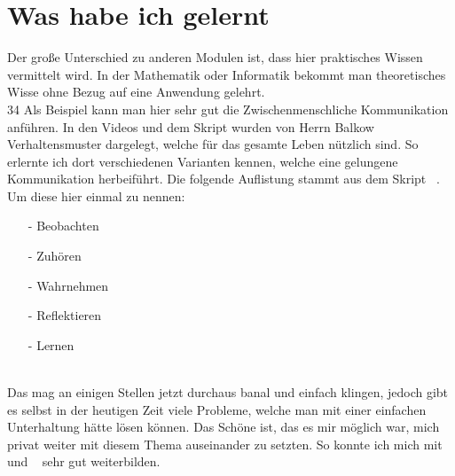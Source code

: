 \chapter{Was habe ich gelernt}

Der große Unterschied zu anderen Modulen ist, dass hier praktisches Wissen vermittelt wird. In der Mathematik oder Informatik  bekommt man theoretisches Wisse ohne Bezug auf eine Anwendung gelehrt. \\


34 Als Beispiel kann man hier sehr gut die Zwischenmenschliche Kommunikation anführen. In den Videos und dem Skript wurden von Herrn Balkow Verhaltensmuster dargelegt, welche für das gesamte Leben nützlich sind. So erlernte ich dort verschiedenen Varianten kennen, welche eine  gelungene Kommunikation herbeiführt. Die folgende Auflistung stammt aus dem Skript ~\cite{Skript}. Um diese hier einmal zu nennen:
\begin{itemize}
	\item[-] Beobachten
	\item[-] Zuhören
	\item[-] Wahrnehmen
	\item[-] Reflektieren
	\item[-] Lernen
\end{itemize} \\

 
Das mag an einigen Stellen jetzt durchaus banal und einfach klingen, jedoch gibt es selbst in der heutigen Zeit viele Probleme, welche man mit einer einfachen Unterhaltung hätte lösen können. Das Schöne ist, das es mir möglich war, mich privat weiter mit diesem Thema auseinander zu setzten. So konnte ich mich mit ~\cite{Schlüssel} und ~\cite{fRede} sehr gut weiterbilden.